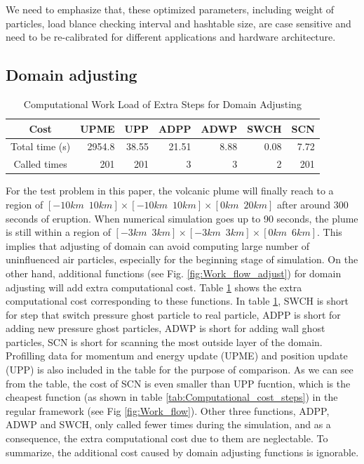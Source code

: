 \documentclass[conference,compsoc]{IEEEtran}
\begin{document}
We need to emphasize that, these optimized parameters, including weight of particles, load blance checking interval and hashtable size, are case sensitive and need to be re-calibrated for different applications and hardware architecture.
%
\subsection{Domain adjusting}
\begin{table}[t!]
  \renewcommand{\arraystretch}{1.2}
  \centering
  \caption{Computational Work Load of Extra Steps for Domain Adjusting}
  \label{tab:Computational_cost_doamin_adj}
  \begin{tabular}{|c|r|r|r|r|r|r|}
    \hline
    Cost & UPME & UPP & ADPP & ADWP & SWCH & SCN\\
    \hline
    Total time (s) & 2954.8 & 38.55 & 21.51 & 8.88 & 0.08 & 7.72 \\
    \hline
    Called times & 201 & 201 & 3 & 3 & 2 & 201 \\
    \hline
  \end{tabular}
\end{table}
For the test problem in this paper, the volcanic plume will finally reach to a region of $[-10km \,\,\, 10km] \times [-10km\,\,\,10km] \times [0km\,\,\,20km]$ after around 300 seconds of eruption. When numerical simulation goes up to 90 seconds, the plume is still within a region of $[-3km\,\,\,3km] \times [-3km\,\,\,3km] \times [0km\,\,\,6km]$. This implies that adjusting of domain can avoid computing large number of uninfluenced air particles, especially for the beginning stage of simulation. On the other hand, additional functions (see Fig. \ref{fig:Work_flow_adjust}) for domain adjusting will add extra computational cost. Table \ref{tab:Computational_cost_doamin_adj} shows the extra computational cost corresponding to these functions. In table \ref{tab:Computational_cost_doamin_adj}, SWCH is short for step that switch pressure ghost particle to real particle, ADPP is short for adding new pressure ghost particles, ADWP is short for adding wall ghost particles, SCN is short for scanning the most outside layer of the domain. Profilling data for momentum and energy update (UPME) and position update (UPP) is also included in the table for the purpose of comparison. As we can see from the table, the cost of SCN is even smaller than UPP fucntion, which is the cheapest function (as shown in table \ref{tab:Computational_cost_steps}) in the regular framework (see Fig \ref{fig:Work_flow}). Other three functions, ADPP, ADWP and SWCH, only called fewer times during the simulation, and as a consequence, the extra computational cost due to them are neglectable. To summarize, the additional cost caused by domain adjusting functions is ignorable.
\end{document}

